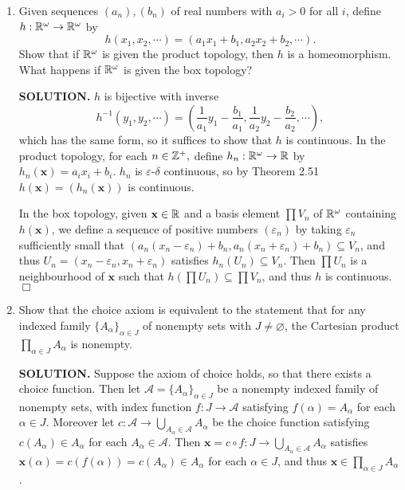 \documentclass{article}
\begin{document}
\begin{enumerate}
    \item Given sequences $(a_n), (b_n)$ of real numbers with $a_i > 0$ for all $i$, define $h: \mathbb{R}^\omega \rightarrow \mathbb{R}^\omega$ by
    $$h(x_1, x_2, \cdots) = (a_1x_1+b_1, a_2x_2+b_2, \cdots).$$
    Show that if $\mathbb{R}^\omega$ is given the product topology, then $h$ is a homeomorphism. What happens if $\mathbb{R}^\omega$ is given the box topology?

    {\bf SOLUTION.} $h$ is bijective with inverse
    $$h^{-1}(y_1, y_2, \cdots) = (\frac{1}{a_1}y_1 - \frac{b_1}{a_1}, \frac{1}{a_2}y_2 - \frac{b_2}{a_2}, \cdots),$$
    which has the same form, so it suffices to show that $h$ is continuous. In the product topology, for each $n \in \mathbb{Z}^+,$ define $h_n: \mathbb{R}^\omega \rightarrow \mathbb{R}$ by $h_n(\mathbf{x}) = a_ix_i+b_i$. $h_n$ is $\varepsilon$-$\delta$ continuous, so by Theorem 2.51 $h(\mathbf{x}) = (h_n(\mathbf{x}))$ is continuous.

    In the box topology, given $\mathbf{x} \in \mathbb{R}$ and a basis element $\prod V_n$ of $\mathbb{R}^\omega$ containing $h(\mathbf{x})$, we define a sequence of positive numbers $(\varepsilon_n)$ by taking $\varepsilon_n$ sufficiently small that $(a_n(x_n - \varepsilon_n) + b_n, a_n(x_n + \varepsilon_n)+b_n) \subseteq V_n$, and thus $U_n = (x_n-\varepsilon_n, x_n+\varepsilon_n)$ satisfies $h_n(U_n) \subseteq V_n$. Then $\prod U_n$ is a neighbourhood of $\mathbf{x}$ such that $h(\prod U_n) \subseteq \prod V_n$, and thus $h$ is continuous. $\Box$

    \item Show that the choice axiom is equivalent to the statement that for any indexed family $\{A_\alpha\}_{\alpha \in J}$ of nonempty sets with $J \neq \varnothing$, the Cartesian product $\prod_{\alpha \in J}A_\alpha$ is nonempty.

    {\bf SOLUTION.} Suppose the axiom of choice holds, so that there exists a choice function. Then let $\mathcal{A} = \{A_\alpha\}_{\alpha \in J}$ be a nonempty indexed family of nonempty sets, with index function $f: J \rightarrow \mathcal{A}$ satisfying $f(\alpha) = A_\alpha$ for each $\alpha \in J$. Moreover let $c: \mathcal{A} \rightarrow \bigcup_{A_\alpha \in \mathcal{A}} A_\alpha$ be the choice function satisfying $c(A_\alpha) \in A_\alpha$ for each $A_\alpha \in \mathcal{A}$. Then $\mathbf{x} = c \circ f: J \rightarrow \bigcup_{A_\alpha \in \mathcal{A}} A_\alpha$ satisfies $\mathbf{x}(\alpha) = c(f(\alpha)) = c(A_\alpha) \in A_\alpha$ for each $\alpha \in J$, and thus $\mathbf{x} \in \prod_{\alpha \in J} A_\alpha$.


\end{enumerate}
\end{document}
